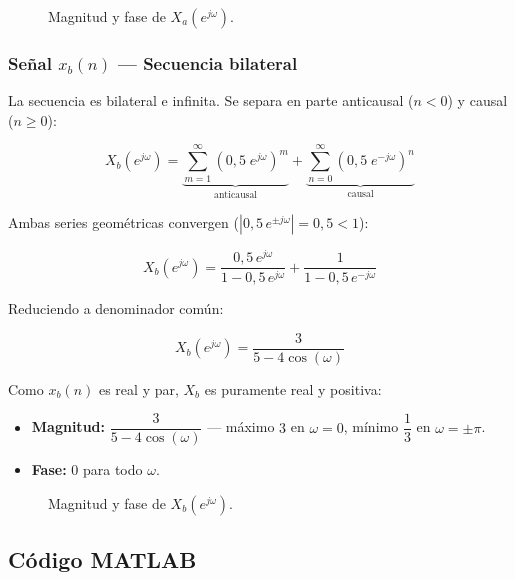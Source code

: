 \documentclass[../Main_Include.tex]{subfiles}
\begin{document}
\begin{figure}[H]
    \centering
    \caption{Magnitud y fase de $X_a(e^{j\omega})$.}
\end{figure}

\subsubsection*{Señal $x_b(n)$ — Secuencia bilateral}

La secuencia es bilateral e infinita. Se separa en parte anticausal
($n < 0$) y causal ($n \ge 0$):

\[
    X_b(e^{j\omega})
    = \underbrace{\sum_{m=1}^{\infty}(0{,}5\;e^{j\omega})^m}_{\text{anticausal}}
    + \underbrace{\sum_{n=0}^{\infty}(0{,}5\;e^{-j\omega})^n}_{\text{causal}}
\]

Ambas series geométricas convergen ($|0{,}5\,e^{\pm j\omega}| = 0{,}5 < 1$):

\[
    X_b(e^{j\omega})
    = \frac{0{,}5\,e^{j\omega}}{1 - 0{,}5\,e^{j\omega}}
    + \frac{1}{1 - 0{,}5\,e^{-j\omega}}
\]

Reduciendo a denominador común:

\[
    \boxed{X_b(e^{j\omega}) = \frac{3}{5 - 4\cos(\omega)}}
\]

Como $x_b(n)$ es real y par, $X_b$ es puramente real y positiva:

\begin{itemize}[leftmargin=1.5cm, itemsep=2pt]
    \item \textbf{Magnitud:} $\dfrac{3}{5-4\cos(\omega)}$
        — máximo $3$ en $\omega = 0$, mínimo $\dfrac{1}{3}$ en $\omega = \pm\pi$.
    \item \textbf{Fase:} $0$ para todo $\omega$.
\end{itemize}

\begin{figure}[H]
    \centering
    \caption{Magnitud y fase de $X_b(e^{j\omega})$.}
\end{figure}

\subsection*{Código MATLAB}


\end{document}
